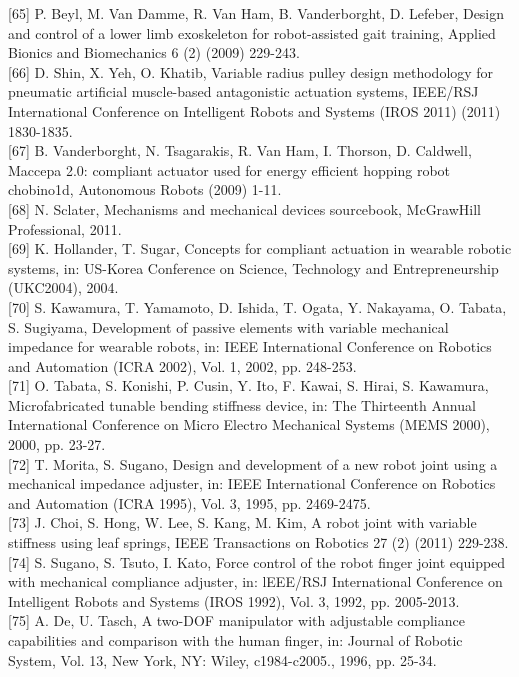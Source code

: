 \documentclass[10pt]{article}
\begin{document}
[65] P. Beyl, M. Van Damme, R. Van Ham, B. Vanderborght, D. Lefeber, Design and control of a lower limb exoskeleton for robot-assisted gait training, Applied Bionics and Biomechanics 6 (2) (2009) 229-243.\\[0pt]
[66] D. Shin, X. Yeh, O. Khatib, Variable radius pulley design methodology for pneumatic artificial muscle-based antagonistic actuation systems, IEEE/RSJ International Conference on Intelligent Robots and Systems (IROS 2011) (2011) 1830-1835.\\[0pt]
[67] B. Vanderborght, N. Tsagarakis, R. Van Ham, I. Thorson, D. Caldwell, Maccepa 2.0: compliant actuator used for energy efficient hopping robot chobino1d, Autonomous Robots (2009) 1-11.\\[0pt]
[68] N. Sclater, Mechanisms and mechanical devices sourcebook, McGrawHill Professional, 2011.\\[0pt]
[69] K. Hollander, T. Sugar, Concepts for compliant actuation in wearable robotic systems, in: US-Korea Conference on Science, Technology and Entrepreneurship (UKC2004), 2004.\\[0pt]
[70] S. Kawamura, T. Yamamoto, D. Ishida, T. Ogata, Y. Nakayama, O. Tabata, S. Sugiyama, Development of passive elements with variable mechanical impedance for wearable robots, in: IEEE International Conference on Robotics and Automation (ICRA 2002), Vol. 1, 2002, pp. 248-253.\\[0pt]
[71] O. Tabata, S. Konishi, P. Cusin, Y. Ito, F. Kawai, S. Hirai, S. Kawamura, Microfabricated tunable bending stiffness device, in: The Thirteenth Annual International Conference on Micro Electro Mechanical Systems (MEMS 2000), 2000, pp. 23-27.\\[0pt]
[72] T. Morita, S. Sugano, Design and development of a new robot joint using a mechanical impedance adjuster, in: IEEE International Conference on Robotics and Automation (ICRA 1995), Vol. 3, 1995, pp. 2469-2475.\\[0pt]
[73] J. Choi, S. Hong, W. Lee, S. Kang, M. Kim, A robot joint with variable stiffness using leaf springs, IEEE Transactions on Robotics 27 (2) (2011) 229-238.\\[0pt]
[74] S. Sugano, S. Tsuto, I. Kato, Force control of the robot finger joint equipped with mechanical compliance adjuster, in: lEEE/RSJ International Conference on Intelligent Robots and Systems (IROS 1992), Vol. 3, 1992, pp. 2005-2013.\\[0pt]
[75] A. De, U. Tasch, A two-DOF manipulator with adjustable compliance capabilities and comparison with the human finger, in: Journal of Robotic System, Vol. 13, New York, NY: Wiley, c1984-c2005., 1996, pp. 25-34.\\[0pt]
\end{document}
